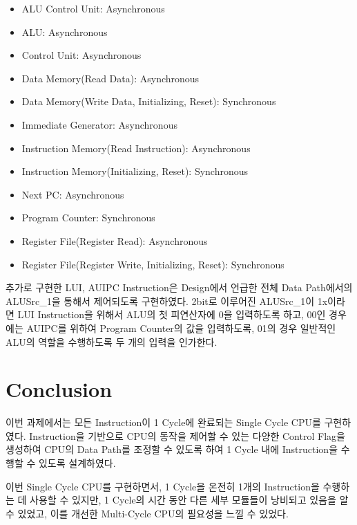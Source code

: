 \documentclass[openright, a4paper]{article}
\begin{document}
\begin{itemize}
    \item ALU Control Unit: Asynchronous
    \item ALU: Asynchronous
    \item Control Unit: Asynchronous
    \item Data Memory(Read Data): Asynchronous
    \item Data Memory(Write Data, Initializing, Reset): Synchronous
    \item Immediate Generator: Asynchronous
    \item Instruction Memory(Read Instruction): Asynchronous
    \item Instruction Memory(Initializing, Reset): Synchronous
    \item Next PC: Asynchronous
    \item Program Counter: Synchronous
    \item Register File(Register Read): Asynchronous
    \item Register File(Register Write, Initializing, Reset): Synchronous
\end{itemize}

추가로 구현한 LUI, AUIPC Instruction은 Design에서 언급한 전체 Data Path에서의 ALUSrc_1을 통해서 제어되도록 구현하였다. 2bit로 이루어진 ALUSrc_1이 1x이라면 LUI Instruction을 위해서 ALU의 첫 피연산자에 0을 입력하도록 하고, 00인 경우에는 AUIPC를 위하여 Program Counter의 값을 입력하도록, 01의 경우 일반적인 ALU의 역할을 수행하도록 두 개의 입력을 인가한다.


\section{Conclusion}
이번 과제에서는 모든 Instruction이 1 Cycle에 완료되는 Single Cycle CPU를 구현하였다. Instruction을 기반으로 CPU의 동작을 제어할 수 있는 다양한 Control Flag을 생성하여 CPU의 Data Path를 조정할 수 있도록 하여 1 Cycle 내에 Instruction을 수행할 수 있도록 설계하였다.

이번 Single Cycle CPU를 구현하면서, 1 Cycle을 온전히 1개의 Instruction을 수행하는 데 사용할 수 있지만, 1 Cycle의 시간 동안 다른 세부 모듈들이 낭비되고 있음을 알 수 있었고, 이를 개선한 Multi-Cycle CPU의 필요성을 느낄 수 있었다.
\end{document}
